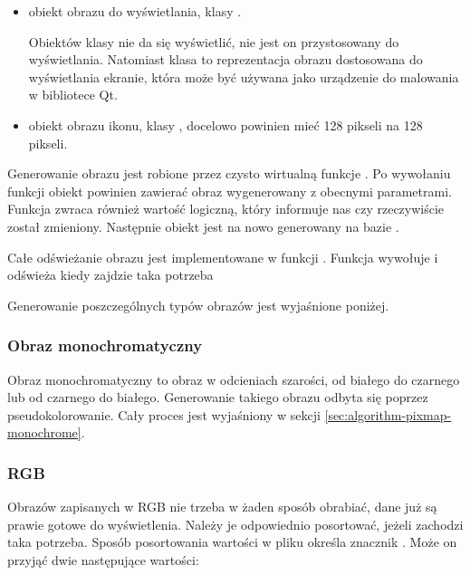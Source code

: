 \begin{itemize}
    \item {} obiekt obrazu do wyświetlania, klasy .

          Obiektów klasy  nie da się wyświetlić, nie jest on przystosowany do wyświetlania.
          Natomiast klasa  to reprezentacja obrazu dostosowana do wyświetlania ekranie, która może być używana jako urządzenie do malowania w bibliotece Qt.

    \item {} obiekt obrazu ikonu, klasy , docelowo powinien mieć 128 pikseli na 128 pikseli.

\end{itemize}

Generowanie obrazu jest robione przez czysto wirtualną funkcje .
Po wywołaniu funkcji obiekt  powinien zawierać obraz wygenerowany z obecnymi parametrami.
Funkcja zwraca również wartość logiczną, który informuje nas czy  rzeczywiście został zmieniony.
Następnie obiekt  jest na nowo generowany na bazie .

Całe odświeżanie obrazu jest implementowane w funkcji .
Funkcja wywołuje  i odświeża  kiedy zajdzie taka potrzeba

Generowanie poszczególnych typów obrazów jest wyjaśnione poniżej.


\subsubsection{Obraz monochromatyczny}
\par
Obraz monochromatyczny to obraz w odcieniach szarości, od białego do czarnego lub od czarnego do białego.
Generowanie takiego obrazu odbyta się poprzez pseudokolorowanie.
Cały proces jest wyjaśniony w sekcji \ref{sec:algorithm-pixmap-monochrome}.

\subsubsection{RGB}
Obrazów zapisanych w RGB nie trzeba w żaden sposób obrabiać, dane już są prawie gotowe do wyświetlenia.
Należy je odpowiednio posortować, jeżeli zachodzi taka potrzeba.
Sposób posortowania wartości w pliku określa znacznik .
Może on przyjąć dwie następujące wartości:

